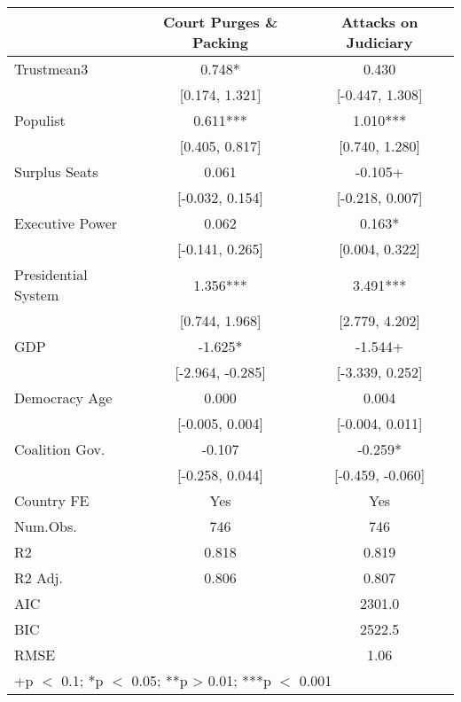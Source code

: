 \begin{table}
\centering\centering\centering
\fontsize{10}{12}\selectfont
\begin{tabular}[t]{lcc}
\toprule
  & Court Purges \& Packing & Attacks on Judiciary\\
\midrule
Trustmean3 & 0.748* & 0.430\\
 & {}[0.174, 1.321] & {}[-0.447, 1.308]\\
Populist & 0.611*** & 1.010***\\
 & {}[0.405, 0.817] & {}[0.740, 1.280]\\
Surplus Seats & 0.061 & -0.105+\\
 & {}[-0.032, 0.154] & {}[-0.218, 0.007]\\
Executive Power & 0.062 & 0.163*\\
 & {}[-0.141, 0.265] & {}[0.004, 0.322]\\
Presidential System & 1.356*** & 3.491***\\
 & {}[0.744, 1.968] & {}[2.779, 4.202]\\
GDP & -1.625* & -1.544+\\
 & {}[-2.964, -0.285] & {}[-3.339, 0.252]\\
Democracy Age & 0.000 & 0.004\\
 & {}[-0.005, 0.004] & {}[-0.004, 0.011]\\
Coalition Gov. & -0.107 & -0.259*\\
 & {}[-0.258, 0.044] & {}[-0.459, -0.060]\\
\midrule
Country FE & Yes & Yes\\
Num.Obs. & 746 & 746\\
R2 & 0.818 & 0.819\\
R2 Adj. & 0.806 & 0.807\\
AIC &  & 2301.0\\
BIC &  & 2522.5\\
RMSE &  & 1.06\\
\bottomrule
\multicolumn{3}{l}{\rule{0pt}{1em}+p $<$ 0.1; *p $<$ 0.05; **p > 0.01; ***p $<$ 0.001}\\
\end{tabular}
\end{table}

